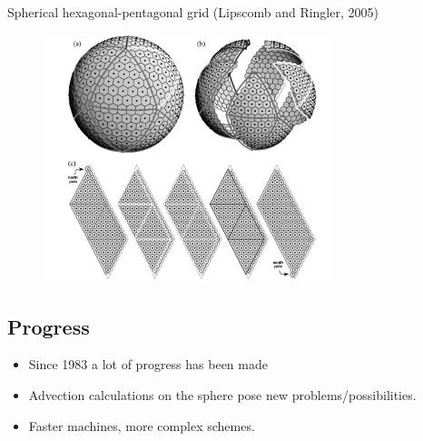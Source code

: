 \documentclass[hyperref={pdfstartview=Fit}]{beamer}
\newcommand{\imsize}{}
\begin{document}
\begin{frame}
Spherical hexagonal-pentagonal grid (Lipscomb and Ringler, 2005)
\begin{figure}
\renewcommand{\imsize}{0.75\textwidth}
\includegraphics[width=\imsize]{lipcomb}%
\end{figure}
\end{frame}

\subsection{Progress}
\begin{frame}
\begin{itemize}
\item Since 1983 a lot of progress has been made
\item Advection calculations on the sphere pose new problems/possibilities. 
\item Faster machines, more complex schemes.
\end{itemize}
\end{frame}



\end{document}
